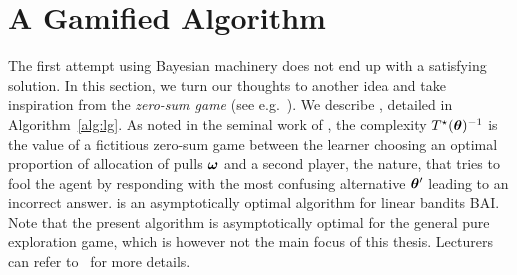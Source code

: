 \section{A Gamified Algorithm}\label{sec:lgc.game}

The first attempt using Bayesian machinery does not end up with a satisfying solution. In this section, we turn our thoughts to another idea and take inspiration from the \emph{zero-sum game} (see e.g.~\citealt{degenne2019pure}). We describe \LG{}, detailed in Algorithm~\ref{alg:lg}. As noted in the seminal work of \citet{chernoff1959}, the complexity $T^{\star}({\boldsymbol \theta})^{-1}$ is the value of a fictitious zero-sum game between the learner choosing an optimal proportion of allocation of pulls ${\boldsymbol \omega}$ and a second player, the nature, that tries to fool the agent by responding with the most confusing alternative ${\boldsymbol \theta}'$ leading to an incorrect answer. \LG{} is an asymptotically optimal algorithm for linear bandits BAI. Note that the present algorithm is asymptotically optimal for the general pure exploration game, which is however not the main focus of this thesis. Lecturers can refer to~\cite{degenne2020game} for more details.





